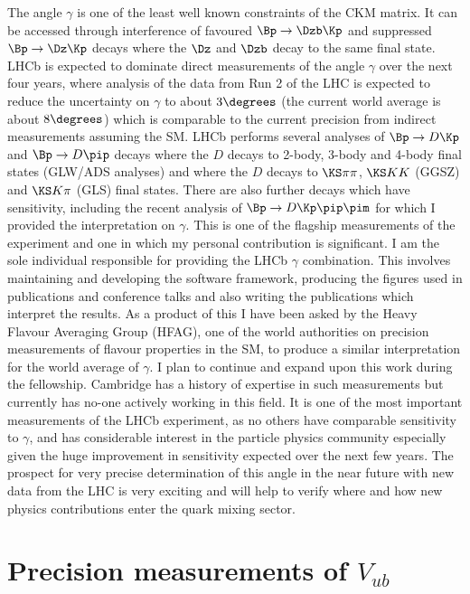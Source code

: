 \documentclass[a4paper, 10pt]{article}
\begin{document}
The angle $\gamma$ is one of the least well known constraints of the CKM matrix. It can be accessed through interference of favoured $\Bp\to\Dzb\Kp$ and suppressed $\Bp\to\Dz\Kp$ decays where the $\Dz$ and $\Dzb$ decay to the same final state. LHCb is expected to dominate direct measurements of the angle $\gamma$ over the next four years, where analysis of the data from Run 2 of the LHC is expected to reduce the uncertainty on $\gamma$ to about $3\degrees$ (the current world average is about $8\degrees$) which is comparable to the current precision from indirect measurements assuming the SM. LHCb performs several analyses of $\Bp\to D\Kp$ and $\Bp\to D\pip$ decays where the $D$ decays to 2-body, 3-body and 4-body final states (GLW/ADS analyses) and where the $D$ decays to $\KS\pi\pi$, $\KS KK$ (GGSZ) and $\KS K\pi$ (GLS) final states. There are also further decays which have sensitivity, including the recent analysis of $\Bp\to D\Kp\pip\pim$ for which I provided the interpretation on $\gamma$. This is one of the flagship measurements of the experiment and one in which my personal contribution is significant. I am the sole individual responsible for providing the LHCb $\gamma$ combination. This involves maintaining and developing the software framework, producing the figures used in publications and conference talks and also writing the publications which interpret the results. As a product of this I have been asked by the Heavy Flavour Averaging Group (HFAG), one of the world authorities on precision measurements of flavour properties in the SM, to produce a similar interpretation for the world average of $\gamma$. I plan to continue and expand upon this work during the fellowship. Cambridge has a history of expertise in such measurements but currently has no-one actively working in this field. It is one of the most important measurements of the LHCb experiment, as no others have comparable sensitivity to $\gamma$, and has considerable interest in the particle physics community especially given the huge improvement in sensitivity expected over the next few years. The prospect for very precise determination of this angle in the near future with new data from the LHC is very exciting and will help to verify where and how new physics contributions enter the quark mixing sector.

\section*{Precision measurements of $V_{ub}$}
\end{document}
